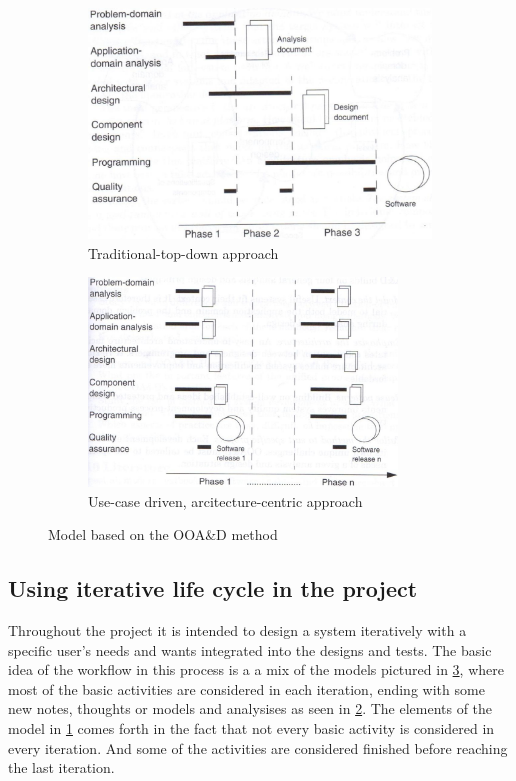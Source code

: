 \begin{figure}[H]
	\centering
	\begin{subfigure}[b]{0.48\textwidth}
		\includegraphics[width=\textwidth]{billeder/SUModel1.jpg}
		\caption{Traditional-top-down approach \citep[p.~16]{Rod-Aalborg}}
		\label{fig:SUModel1}
	\end{subfigure}
	\quad
	\begin{subfigure}[b]{0.48\textwidth}
		\includegraphics[width=0.9\textwidth]{billeder/SUModel2.jpg}
		\caption{Use-case driven, arcitecture-centric approach \citep[p.~17]{Rod-Aalborg}}
		\label{fig:SUModel2}
	\end{subfigure}
	\caption{Model based on the OOA\&D method}\label{fig:SUModels}
\end{figure}

\subsection{Using iterative life cycle in the project}
Throughout the project it is intended to design a system iteratively with a specific user’s needs and wants integrated into the designs and tests. 
The basic idea of the workflow in this process is a a mix of the models pictured in \cref{fig:SUModels}, where most of the basic activities are considered in each iteration, ending with some new notes, thoughts or models and analysises as seen in \cref{fig:SUModel2}.
The elements of the model in \cref{fig:SUModel1} comes forth in the fact that not every basic activity is considered in every iteration. And some of the activities are considered finished before reaching the last iteration.

